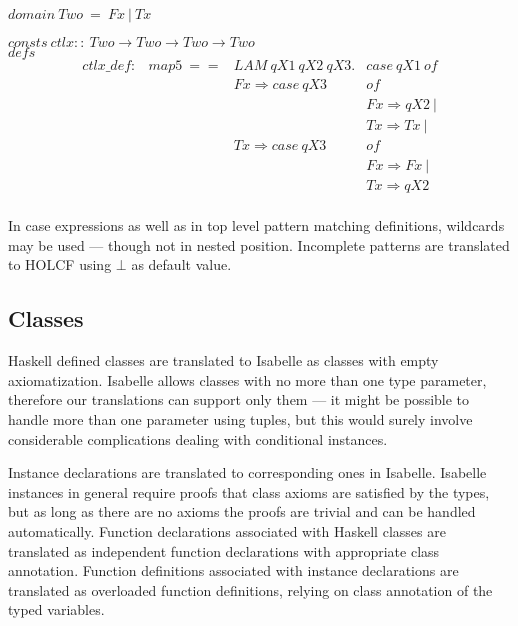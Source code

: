 \documentclass[a4paper,12pt]{article}
\begin{document}
\noindent $domain \ Two \ = \ Fx \ | \ Tx $

\noindent $consts \ ctlx :: \ Two \to Two \to Two \to Two$\\

\noindent $defs$
$$\begin{array}{llll}
ctlx\_def : & map5 \ == & LAM \ qX1 \ qX2 \ qX3. & case \ qX1 \ of \\
                                             & & Fx \Rightarrow case \ qX3 & of \\
                                             & & & Fx \Rightarrow qX2 \ | \\
                                             & & & Tx \Rightarrow Tx \ | \\
                                             & & Tx \Rightarrow case \ qX3 & of \\
                                             & & & Fx \Rightarrow Fx \ | \\
                                             & & & Tx \Rightarrow qX2 \\
\end{array}$$

\noindent In case expressions as well as in top level pattern matching
definitions, wildcards may be used --- though not in nested position.
Incomplete patterns are translated to HOLCF using $\bot$ as default
value.

\subsection{Classes}

Haskell defined classes are translated to Isabelle as classes with
empty axiomatization.  Isabelle allows classes with no more than one
type parameter, therefore our translations can support only them ---
it might be possible to handle more than one parameter using tuples,
but this would surely involve considerable complications dealing with
conditional instances.

Instance declarations are translated to corresponding ones in
Isabelle. Isabelle instances in general require proofs that class
axioms are satisfied by the types, but as long as there are no axioms
the proofs are trivial and can be handled automatically.  Function
declarations associated with Haskell classes are translated as
independent function declarations with appropriate class annotation.
Function definitions associated with instance declarations are
translated as overloaded function definitions,
relying on class annotation of the typed variables.\\
\end{document}
